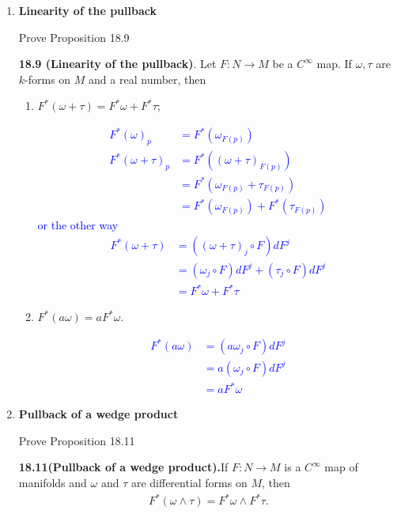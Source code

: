 \documentclass[12pt,a4paper]{report}
\newcommand{\BLUE}[1]{\textcolor{blue}{#1}}
\begin{document}
\begin{enumerate}[label=18.\arabic*]
\begin{propp}
\end{propp}
	
\item \textbf{Linearity of the pullback}

	Prove Proposition 18.9
	
	\begin{propp}\textbf{18.9 (Linearity of the pullback)}. Let $F:N \to M$ be a $C^\infty$ map. If $\omega,\tau$ are $k$-forms on $M$ and a real number, then
	\begin{enumerate}[label=(\roman*)]
		\item $F^*(\omega+\tau) = F^*\omega + F^*\tau$;
		
		\BLUE{\begin{align*}
			F^*(\omega)_p &= F^*(\omega_{F(p)}) \\
			F^*(\omega+\tau)_p &= F^*((\omega+\tau)_{F(p)}) \\
			&= F^*(\omega_{F(p)}+\tau_{F(p)}) \\
			&= F^*(\omega_{F(p)})+F^*(\tau_{F(p)})
		\end{align*} or the other way
		\begin{align*}
			F^*(\omega+\tau) &= ((\omega+\tau)_j\circ F)dF^j \\
			 &= (\omega_j\circ F)dF^j+(\tau_j\circ F)dF^j \\
			 &= F^*\omega + F^*\tau
		\end{align*}
		}
		
		\item $F^*(a\omega)=aF^*\omega$.
		
		\BLUE{
			\begin{align*}
				F^*(a\omega) &= (a\omega_j\circ F)dF^j \\
				&= a(\omega_j\circ F)dF^j \\
				&= aF^*\omega
			\end{align*}			
		}
	\end{enumerate}
	\end{propp}\HLINE
	
\item \textbf{Pullback of a wedge product}

	Prove Proposition 18.11
		
	\begin{propp}\textbf{18.11(Pullback of a wedge product).}If $F:N\to M$ is a $C^\infty$ map of manifolds and $\omega$ and $\tau$ are differential forms on $M$, then 
	\begin{align*}
		F^*(\omega\wedge\tau) = F^*\omega\wedge F^*\tau.
	\end{align*}
	\end{propp}\HLINE
	

\end{enumerate}
\end{document}
